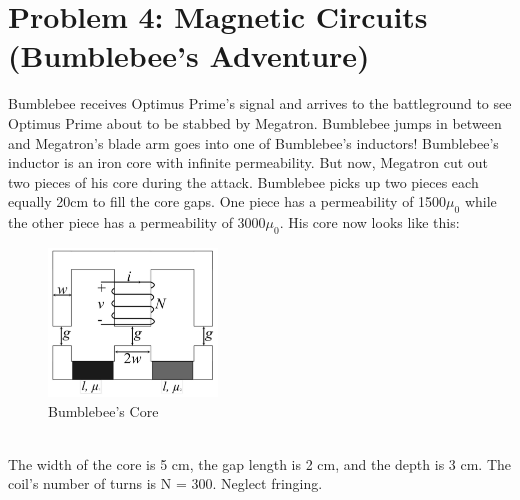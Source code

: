 \documentclass{article}
\begin{document}
\section*{Problem 4: Magnetic Circuits (Bumblebee's Adventure)}
Bumblebee receives Optimus Prime's signal and arrives to the battleground to see Optimus Prime about to be stabbed by Megatron. Bumblebee jumps in between and Megatron's blade arm goes into one of Bumblebee's inductors! Bumblebee's inductor is an iron core with infinite permeability. But now, Megatron cut out two pieces of his core during the attack. Bumblebee picks up two pieces each equally 20cm to fill the core gaps. One piece has a permeability of 1500$\mu_0$ while the other piece has a permeability of 3000$\mu_0$. His core now looks like this:
\begin{figure}[!htb]
        \centering
        \includegraphics[width=0.4\textwidth]{figures/coreQ4.PNG}
        \caption{Bumblebee's Core}
        \label{poletradsaj}
\end{figure} \\ The width of the core is 5 cm, the gap length is 2 cm, and the depth is 3 cm. The coil's number of turns is N = 300. Neglect fringing.
\end{document}
